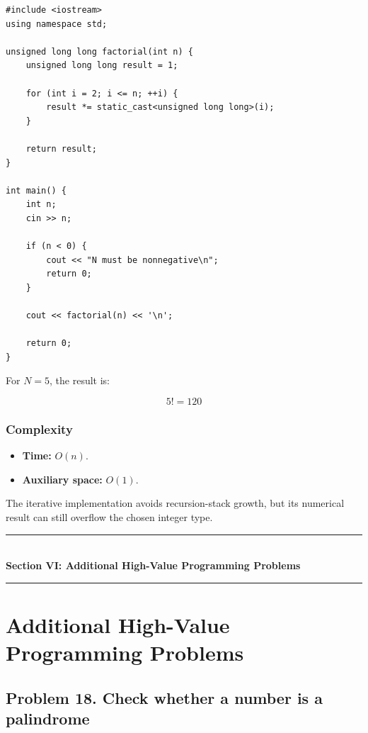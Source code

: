 \begin{lstlisting}[style=cppstyle]
#include <iostream>
using namespace std;

unsigned long long factorial(int n) {
    unsigned long long result = 1;

    for (int i = 2; i <= n; ++i) {
        result *= static_cast<unsigned long long>(i);
    }

    return result;
}

int main() {
    int n;
    cin >> n;

    if (n < 0) {
        cout << "N must be nonnegative\n";
        return 0;
    }

    cout << factorial(n) << '\n';

    return 0;
}
\end{lstlisting}

For $N=5$, the result is:


\[
5!=\boxed{120}
\]


\subsubsection{Complexity}

\begin{itemize}
    \item \textbf{Time:} $O(n)$.
    \item \textbf{Auxiliary space:} $O(1)$.
\end{itemize}

The iterative implementation avoids recursion-stack growth, but its numerical result can still overflow the chosen integer type.


\newpage
\begin{center}
\vspace{0.5em}
{\color{primary}\rule{0.45\textwidth}{1.2pt}}\\[4pt]
{\Large\bfseries\color{primary} Section VI: Additional High-Value Programming Problems}\\[2pt]
{\color{primary}\rule{0.45\textwidth}{1.2pt}}
\vspace{0.5em}
\end{center}

\section{Additional High-Value Programming Problems}


\subsection{Problem 18. Check whether a number is a palindrome}

